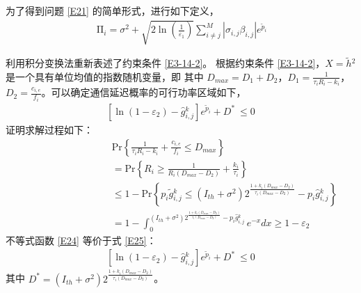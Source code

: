 为了得到问题 \eqref{E21} 的简单形式，进行如下定义，
\begin{eqnarray}\label{E22}
\ \mathrm{\Pi}_i=\sigma^2+\sqrt{2\ln\left(\frac{1}{\varepsilon_1}\right)}\sum_{i\neq j}^{M}{\left|\sigma_{i,j}\beta_{i,j}\right|e^{{\widetilde{p}}_i}}
\end{eqnarray}

利用积分变换法重新表述了约束条件 \eqref{E3-14-2}。 根据约束条件 \eqref{E3-14-2}，$X={\widetilde{h}}\phantom{}^2$ 是一个具有单位均值的指数随机变量，即 其中 $D_{max}=D_1+D_2 $，$D_1=\frac{1}{\tau_iR_i-k_i} $，$D_2=\frac{c_{i,e}}{f_i} $。可以确定通信延迟概率的可行功率区域如下，
\begin{eqnarray}\label{E23}
\left.\left[\ln\left(1-\varepsilon_2\right)-{\hat{g}}\phantom{}_{i,j}^k\right.\right]e^{{\widetilde{p}}_i}+D^\ast\ \le0
\end{eqnarray}
证明求解过程如下：
\begin{equation}\label{E24}
\begin{array}{ll}
\qquad\qquad\qquad\qquad\quad\textrm{Pr}\left\{\frac{1}{\tau_iR_i-k_i}+\frac{c_{i,e}}{f_i}\le D_{max}\right\}\\
\qquad\qquad\qquad\qquad\quad=\textrm{Pr}\left\{R_i\geq\frac{1}{R_i\left(D_{max}-D_2\right)}+\frac{k_i}{\tau_i}\right\}\\
\qquad\qquad\qquad\qquad\quad\!\le1\!-\!\textrm{Pr}\left\{p_i{\widetilde{g}}\phantom{}_{i,j}^k\le\left(I_{th}+\sigma^2\right)2^\frac{1+k_i\left(D_{max}-D_2\right)}{\tau_i\left(D_{max}-D_2\right)}-p_i{\hat{g}}\phantom{}_{i,j}^k\right\}\\
\qquad\qquad\qquad\qquad\quad=\!1\!-\!\int_{0}^{\left(I_{th}+\sigma^2\right)2^\frac{1+k_i\left(D_{max}-D_2\right)}{\tau_i\left(D_{max}-D_2\right)}-p_i{\hat{g}}\phantom{}_{i,j}^k}{e^{-x}dx}\!\geq\!1-\varepsilon_2
\end{array}
\end{equation}
不等式函数 \eqref{E24} 等价于式 \eqref{E25}：
\begin{eqnarray}\label{E25}
\left.\left[\ln\left(1-\varepsilon_2\right)-{\hat{g}}\phantom{}_{i,j}^k\right.\right]e^{{\widetilde{p}}_i}+D^\ast\ \le0
\end{eqnarray}
其中 $D^\ast=\left(I_{th}+\sigma^2\right)2^\frac{1+k_i\left(D_{max}-D_2\right)}{\tau_i\left(D_{max}-D_2\right)}$。

